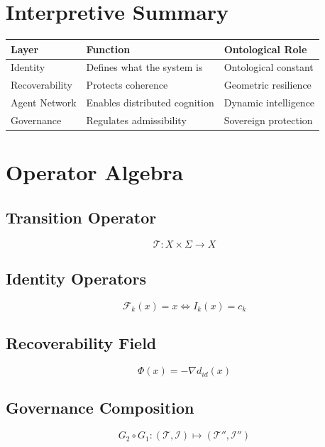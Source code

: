 \documentclass[12pt]{article}
\begin{document}
\section{Interpretive Summary}
\begin{tabular}{|l|l|l|}
\hline
\textbf{Layer} & \textbf{Function} & \textbf{Ontological Role} \\
\hline
Identity & Defines what the system is & Ontological constant \\
Recoverability & Protects coherence & Geometric resilience \\
Agent Network & Enables distributed cognition & Dynamic intelligence \\
Governance & Regulates admissibility & Sovereign protection \\
\hline
\end{tabular}

\appendix
\section{Operator Algebra}
\subsection{Transition Operator}
\[
\mathcal{T}: X \times \Sigma \to X
\]

\subsection{Identity Operators}
\[
\mathcal{F}_k(x) = x \iff I_k(x) = c_k
\]

\subsection{Recoverability Field}
\[
\Phi(x) = -\nabla d_{id}(x)
\]

\subsection{Governance Composition}
\[
G_2 \circ G_1 : (\mathcal{T}, \mathcal{I}) \mapsto (\mathcal{T}'', \mathcal{I}'')
\]
\end{document}
